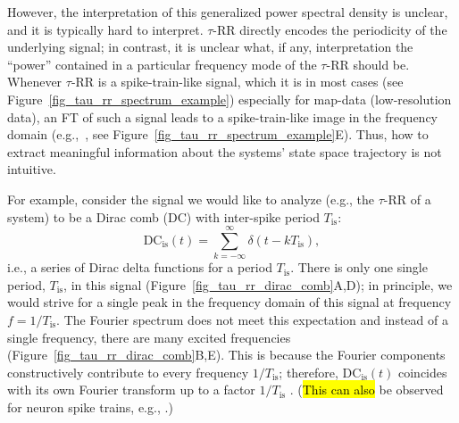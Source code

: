 \documentclass[entropy,article,accept,pdftex,moreauthors]{Definitions/mdpi}
\begin{document}
However, the interpretation of this generalized power spectral density is unclear, and it is typically hard to interpret. $\tau$-RR directly encodes the periodicity of the underlying signal; in contrast, it is unclear what, if any, interpretation the ``power'' contained in a particular frequency mode of the $\tau$-RR should be. Whenever $\tau$-RR is a spike-train-like signal, which it is in most cases (see Figure~\ref{fig_tau_rr_spectrum_example}) especially for 
map-data (low-resolution data), an FT of such a signal leads to a spike-train-like image in the frequency domain (e.g.,~\cite{Schild1982,Cordoba1989}, see 
Figure~\ref{fig_tau_rr_spectrum_example}E). Thus, how to extract meaningful information about the systems' state space trajectory is not intuitive. 

For example, consider the signal we would like to analyze 
(e.g., the $\tau$-RR of a system) to be a Dirac comb (DC) with inter-spike period $T_\text{is}$: 
\begin{equation}
\text{DC}_{\text{is}}(t) = \sum_{k=-\infty}^{\infty} \delta(t-kT_\text{is}),
\label{eq_dirac_comb}
\end{equation}
i.e., a series of Dirac delta functions for a period $T_\text{is}$. There is only one single period, $T_\text{is}$, in this signal (Figure~\ref{fig_tau_rr_dirac_comb}A,D); 
in principle, we would strive for a single peak in the frequency domain of this signal at frequency $f=1/T_\text{is}$. The Fourier spectrum does not meet this expectation 
and instead of a single frequency, there are many excited frequencies (Figure~\ref{fig_tau_rr_dirac_comb}B,E). This is because the Fourier components constructively contribute
to every frequency $1/T_\text{is}$; therefore, $\text{DC}_{\text{is}}(t)$ coincides with its own Fourier transform up to a factor $1/T_\text{is}$ \cite{Norden1998}. ({\hl{This can also } %
be observed for neuron spike trains, e.g., \cite{Orcioni2020,Biagetti2017}.})
\end{document}
